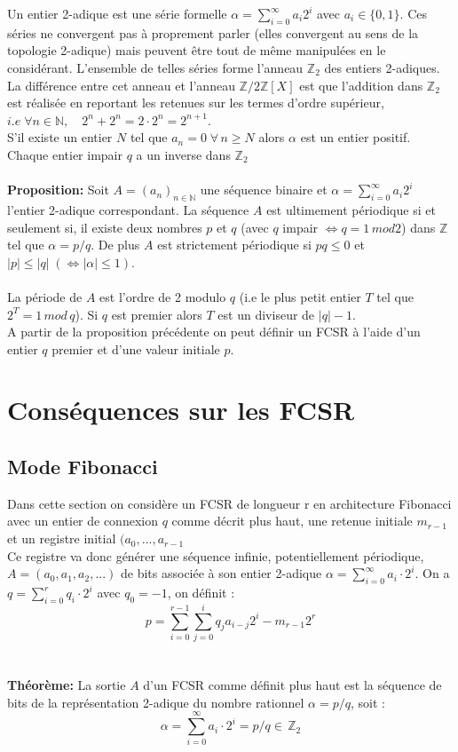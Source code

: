 \documentclass[11pt]{report}
\begin{document}
	Un entier 2-adique est une série formelle $\alpha = \sum_{i=0}^\infty a_i2^i$ avec $a_i \in \{0,1\}$.
	Ces séries ne convergent pas à proprement parler (elles convergent au sens de la topologie 2-adique) mais peuvent être tout de même manipulées en le considérant. L'ensemble de telles séries forme l'anneau $\mathbb{Z}_2$ des entiers 2-adiques. La différence entre cet anneau et l'anneau $\mathbb{Z}/2\mathbb{Z}[X]$ est que l'addition dans $\mathbb{Z}_2$ est réalisée en reportant les retenues sur les termes d'ordre supérieur, $i.e\;\forall n \in \mathbb{N},\quad 2^n+2^n = 2 \cdot 2^n = 2^{n+1}$.
	\\
	S'il existe un entier $N$ tel que $a_n=0 \; \forall \, n \geq N$ alors $\alpha$ est un entier positif. Chaque entier impair $q$ a un inverse dans $\mathbb{Z}_2$
	\\
	\\
	\textbf{Proposition:} Soit $A=(a_n)_{n \in \mathbb{N}}$ une séquence binaire et $\alpha = \sum_{i=0}^\infty a_i2^i$ l'entier 2-adique correspondant. La séquence $A$ est ultimement périodique si et seulement si, il existe deux nombres $p$ et $q$ (avec $q$ impair $\iff q=1\,mod2$)  dans $\mathbb{Z}$ tel que $\alpha = p/q$. De plus $A$ est strictement périodique si $pq \leq 0$ et $|p| \leq |q| \;(\iff |\alpha| \leq 1)$.
	\\
	\\
	La période de $A$ est l'ordre de 2 modulo $q$ (i.e le plus petit entier $T$ tel que $2^T = 1\,mod \,q$). Si $q$ est premier alors $T$ est un diviseur de $|q| - 1$. 
	\\
	A partir de la proposition précédente on peut définir un FCSR à l'aide d'un entier $q$ premier et d'une valeur initiale $p$.
	
	\section{Conséquences sur les FCSR}
	\subsection{Mode Fibonacci}
	Dans cette section on considère un FCSR de longueur r en architecture Fibonacci avec un entier de connexion $q$ comme décrit plus haut, une retenue initiale $m_{r-1}$ et un registre initial $(a_0,...,a_{r-1}$ 
	\\
	Ce registre va donc générer une séquence infinie, potentiellement périodique, $A = (a_0,a_1,a_2,...)$ de bits associée à son entier 2-adique $\alpha = \sum_{i=0}^\infty a_i \cdot 2^i$.
	On a $q = \sum_{i=0}^r q_i \cdot 2^i$ avec $q_0 = -1$, on définit : 
	\[
	p= \sum_{i=0}^{r-1} \sum_{j=0}^i q_ja_{i-j}2^i - m_{r-1}2^r
	\]
	\\
	\\
	\textbf{Théorème:}
	La sortie $A$ d'un FCSR comme définit plus haut est la séquence de bits de la représentation 2-adique du nombre rationnel $\alpha = p/q$, soit :
	\[
	\alpha = \sum_{i=0}^\infty a_i \cdot 2^i = p/q \in \, \mathbb{Z}_2
	\]	
	
\end{document}
